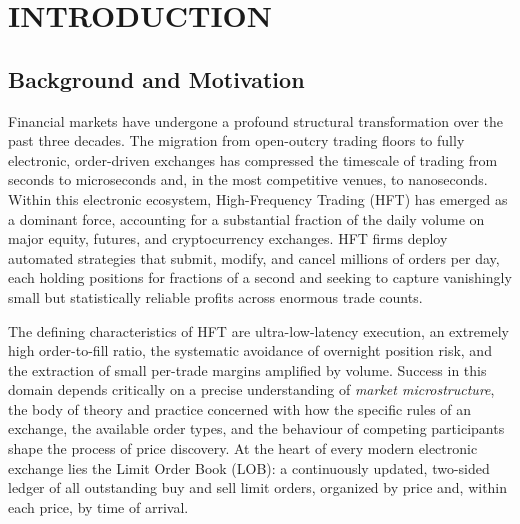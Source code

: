 \documentclass[12pt,oneside,a4paper]{report}
\renewcommand{\cftchapfont}{\bfseries}
\renewcommand{\cftchappagefont}{\bfseries}
\begin{document}
\clearpage
\addtocontents{toc}{\protect\renewcommand{\protect\cftchapfont}{\bfseries}}
\addtocontents{toc}{\protect\renewcommand{\protect\cftchappagefont}{\bfseries}}
\setcounter{page}{1}

\chapter{INTRODUCTION}
\label{ch:intro}

\section{Background and Motivation}
\label{sec:background}

Financial markets have undergone a profound structural transformation over the past three decades. The migration from open-outcry trading floors to fully electronic, order-driven exchanges has compressed the timescale of trading from seconds to microseconds and, in the most competitive venues, to nanoseconds. Within this electronic ecosystem, High-Frequency Trading (HFT) has emerged as a dominant force, accounting for a substantial fraction of the daily volume on major equity, futures, and cryptocurrency exchanges. HFT firms deploy automated strategies that submit, modify, and cancel millions of orders per day, each holding positions for fractions of a second and seeking to capture vanishingly small but statistically reliable profits across enormous trade counts.

The defining characteristics of HFT are ultra-low-latency execution, an extremely high order-to-fill ratio, the systematic avoidance of overnight position risk, and the extraction of small per-trade margins amplified by volume. Success in this domain depends critically on a precise understanding of \textit{market microstructure}, the body of theory and practice concerned with how the specific rules of an exchange, the available order types, and the behaviour of competing participants shape the process of price discovery. At the heart of every modern electronic exchange lies the Limit Order Book (LOB): a continuously updated, two-sided ledger of all outstanding buy and sell limit orders, organized by price and, within each price, by time of arrival.
\end{document}

